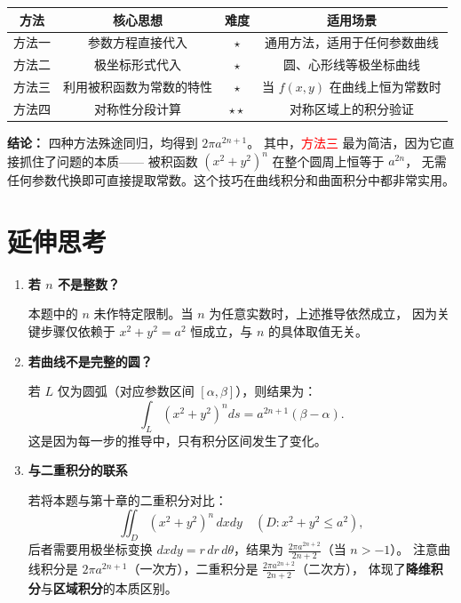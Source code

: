 \documentclass[12pt,a4paper]{ctexart}
\theoremstyle{myremark}
\begin{document}
\begin{center}
\renewcommand{\arraystretch}{1.6}
\begin{tabular}{|c|c|c|c|}
  \hline
  \textbf{方法} & \textbf{核心思想} & \textbf{难度} & \textbf{适用场景} \\
  \hline
  方法一 & 参数方程直接代入 & $\star$ & 通用方法，适用于任何参数曲线 \\
  \hline
  方法二 & 极坐标形式代入 & $\star$ & 圆、心形线等极坐标曲线 \\
  \hline
  方法三 & 利用被积函数为常数的特性 & $\star$ & 当 $f(x,y)$ 在曲线上恒为常数时 \\
  \hline
  方法四 & 对称性分段计算 & $\star\star$ & 对称区域上的积分验证 \\
  \hline
\end{tabular}
\end{center}

\bigskip

\noindent\textbf{结论：} 四种方法殊途同归，均得到 $\boxed{2\pi a^{2n+1}}$。
其中，\textcolor{red}{方法三} 最为简洁，因为它直接抓住了问题的本质——
被积函数 $(x^2+y^2)^n$ 在整个圆周上恒等于 $a^{2n}$，
无需任何参数代换即可直接提取常数。这个技巧在曲线积分和曲面积分中都非常实用。

\section*{延伸思考}

\begin{enumerate}[leftmargin=*]

  \item \textbf{若 $n$ 不是整数？}

  本题中的 $n$ 未作特定限制。当 $n$ 为任意实数时，上述推导依然成立，
  因为关键步骤仅依赖于 $x^2+y^2=a^2$ 恒成立，与 $n$ 的具体取值无关。

  \item \textbf{若曲线不是完整的圆？}

  若 $L$ 仅为圆弧（对应参数区间 $[\alpha, \beta]$），则结果为：
  \[
  \int_L (x^2+y^2)^n ds = a^{2n+1}(\beta - \alpha).
  \]
  这是因为每一步的推导中，只有积分区间发生了变化。

  \item \textbf{与二重积分的联系}

  若将本题与第十章的二重积分对比：
  \[
  \iint_D (x^2+y^2)^n \,dxdy \quad (D: x^2+y^2 \leq a^2),
  \]
  后者需要用极坐标变换 $dxdy = r\,dr\,d\theta$，结果为 $\frac{2\pi a^{2n+2}}{2n+2}$（当 $n > -1$）。
  注意曲线积分是 $2\pi a^{2n+1}$（一次方），二重积分是 $\frac{2\pi a^{2n+2}}{2n+2}$（二次方），
  体现了\textbf{降维积分}与\textbf{区域积分}的本质区别。

\end{enumerate}
\end{document}
